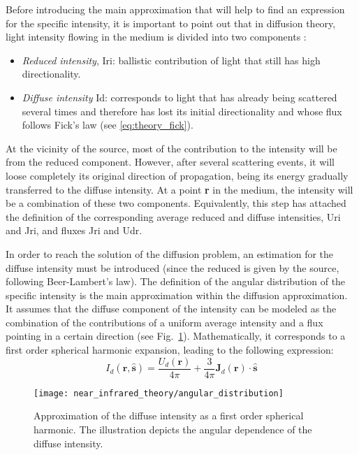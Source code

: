 Before introducing the main approximation that will help to find an expression for the specific intensity, it is important to point out that in diffusion theory, light intensity flowing in the medium is divided into two components \cite{Ishimaru1978}:

\begin{itemize}
\item \textit{Reduced intensity}, \gls{Iri}: ballistic contribution of light that still has high directionality.
\item \textit{Diffuse intensity} \gls{Id}: corresponds to light that has already being scattered several times and therefore has lost its initial directionality and whose flux follows Fick's law (see \ref{eq:theory_fick}).
\end{itemize}

At the vicinity of the source, most of the contribution to the intensity will be from the reduced component. However, after several scattering events, it will loose completely its original direction of propagation, being its energy gradually transferred to the diffuse intensity. At a point \textbf{r} in the medium, the intensity will be a combination of these two components. Equivalently, this step has attached the definition of the corresponding average reduced and diffuse intensities, \gls{Uri} and \gls{Jri}, and fluxes \gls{Jri} and \gls{Udr}. 

In order to reach the solution of the diffusion problem, an estimation for the diffuse intensity must be introduced (since the reduced is given by the source, following Beer-Lambert's law). The definition of the angular distribution of the specific intensity is the main approximation within the diffusion approximation. It assumes that the diffuse component of the intensity can be modeled as the combination of the contributions of a uniform average intensity and a flux pointing in a certain direction (see Fig.~\ref{fig:theory_ang_dist}). Mathematically, it corresponds to a first order spherical harmonic expansion, leading to the following expression:
\begin{equation}
I_d\left(\mathbf{r},\mathbf{\hat{s}}\right)=
\frac{U_d\left(\mathbf{r}\right)}{4\pi}+
\frac{3}{4\pi}\mathbf{J}_d(\mathbf{r})\cdot\mathbf{\hat{s}}
\label{eq:theory_ang_dist}
\end{equation}

\begin{figure}[]
\sidecaption[]
\texttt{[image: near\_infrared\_theory/angular\_distribution]}
\caption[Angular distribution of diffuse light.]{Approximation of the diffuse intensity as a first order spherical harmonic. The illustration depicts the angular dependence of the diffuse intensity.}
\label{fig:theory_ang_dist} 
\end{figure}

